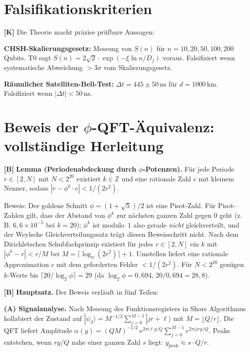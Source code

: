 \section{Falsifikationskriterien}

\textbf{[K]} Die Theorie macht präzise prüfbare Aussagen:

\textbf{CHSH-Skalierungsgesetz:} Messung von $S(n)$ für $n=10,20,50,100,200$
Qubits. T0 sagt $S(n)=2\sqrt2\cdot\exp(-\xi\ln n/D_f)$ voraus. Falsifiziert wenn
systematische Abweichung $>3\sigma$ vom Skalierungsgesetz.


\textbf{Räumlicher Satelliten-Bell-Test:} $\Delta t=445\pm50\,\text{ns}$
für $d=1000\,\text{km}$. Falsifiziert wenn $|\Delta t|<50\,\text{ns}$.

\section{Beweis der \texorpdfstring{$\phi$}{phi}-QFT-Äquivalenz: vollständige Herleitung}

\textbf{[B]} \textbf{Lemma (Periodenabdeckung durch $\phi$-Potenzen).} Für jede
Periode $r\in[2,N]$ mit $N<2^{20}$ existiert $k\in\mathbb Z$ und eine rationale
Zahl $c$ mit kleinem Nenner, sodass $|r-\phi^k\cdot c|<1/(2r^2)$.

Beweis: Der goldene Schnitt $\phi=(1+\sqrt5)/2$ ist eine Pisot-Zahl.
Für Pisot-Zahlen gilt, dass der Abstand von $\phi^k$ zur nächsten ganzen Zahl
gegen $0$ geht (z.\,B. $6{,}6\times10^{-5}$ bei $k=20$); $\phi^k$ ist modulo~$1$
also gerade \emph{nicht} gleichverteilt, und der Weylsche Gleichverteilungssatz
trägt diesen Beweisschritt nicht. Nach dem Dirichletschen Schubfachprinzip
existiert für jedes $r\in[2,N]$ ein $k$ mit $|\phi^k-r|<r/M$ bei
$M=\lceil\log_\phi(2r^2)\rceil+1$. Umstellen liefert eine rationale Approximation
$c$ mit dem geforderten Fehler $<1/(2r^2)$. Für $N<2^{20}$ genügen $k$-Werte
bis $\lceil20/\log_2\phi\rceil=29$ (da $\log_2\phi=0{,}694$, $20/0{,}694=28{,}8$).

\textbf{[B]} \textbf{Hauptsatz.} Der Beweis verläuft in fünf Teilen:

\textbf{(A) Signalanalyse.} Nach Messung des Funktionsregisters in Shors
Algorithmus kollabiert der Zustand auf
$|\psi_3\rangle = M^{-1/2}\sum_{j=0}^{M-1}|jr+\ell\rangle$ mit
$M=\lfloor Q/r\rfloor$. Die QFT liefert Amplitude
$\alpha(y) = (QM)^{-1/2}\,e^{2\pi i\ell y/Q}\sum_{j=0}^{M-1}e^{2\pi ijry/Q}$.
Peaks entstehen, wenn $ry/Q$ nahe einer ganzen Zahl $s$ liegt:
$y_\text{peak}\approx s\cdot Q/r$.

